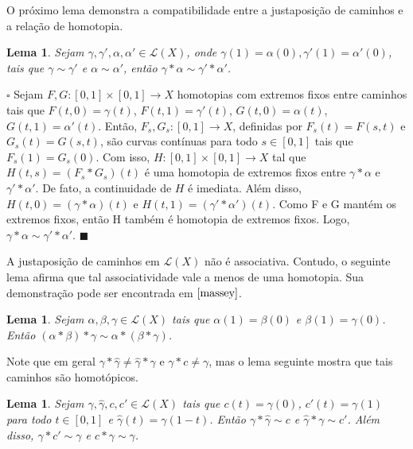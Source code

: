 \documentclass[12pt]{book}
\newtheorem{lema}[teorema]{Lema}
\newenvironment{prova}[1]{$\square$ #1}{\hfill$\blacksquare$}
\newcommand{\caminhos}{\mathcal{L}}
\newcommand{\caminhossempontobase}[1]{\caminhos(#1)}
\newcommand{\intervalo}{[0,1]}
\begin{document}
	O próximo lema demonstra a compatibilidade entre a justaposição de caminhos e a relação de homotopia.
	
	\begin{lema}\label{lema_compatibilidade_produto_caminhos}
		Sejam $\gamma, \gamma', \alpha, \alpha' \in \caminhossempontobase{X}$, onde $\gamma(1) = \alpha(0), \gamma'(1) = \alpha'(0) $, tais que $\gamma \sim \gamma'$ e $\alpha \sim \alpha'$, então $\gamma * \alpha \sim \gamma' * \alpha'$.
	\end{lema}
	\begin{prova}
		Sejam  $F, G:[0,1] \times [0,1] \to X$ homotopias com extremos fixos entre caminhos tais que $F(t,0)=\gamma(t)$, $F(t,1)=\gamma'(t)$, $G(t,0)=\alpha(t)$, $G(t,1)=\alpha'(t)$. Então, $F_{s}, G_{s}:\intervalo \to X$, definidas por $F_{s}(t) = F(s,t)$ e $G_{s}(t) = G(s,t)$, são curvas contínuas para todo $s \in \intervalo$ tais que $F_{s}(1) = G_{s}(0)$. Com isso, $H :\intervalo\times \intervalo\to X$ tal que $H(t, s)=(F_{s}*G_{s})(t)$ é uma homotopia de extremos fixos entre $\gamma*\alpha$ e $\gamma'*\alpha'$. De fato, a continuidade de $H$ é imediata. Além disso, $H(t, 0) = (\gamma*\alpha)(t)$ e $H(t, 1) = (\gamma'*\alpha')(t)$. Como F e G mantém os extremos fixos, então H também é homotopia de extremos fixos. Logo, $\gamma*\alpha \sim \gamma'*\alpha'$.
	\end{prova}
	
	A justaposição de caminhos em $\caminhossempontobase{X}$ não é associativa. Contudo, o seguinte lema afirma que tal associatividade vale a menos de uma homotopia. Sua demonstração pode ser encontrada em $\cite{massey}$.
	
	\begin{lema}\label{lema_associatividade_produto_caminhos}
		Sejam $\alpha, \beta, \gamma\in \caminhossempontobase{X}$ tais que $\alpha(1)=\beta(0)$ e $\beta(1)=\gamma(0)$. Então $(\alpha*\beta)*\gamma \sim \alpha*(\beta*\gamma)$.
	\end{lema}
	
	Note que em geral $\gamma*\hat{\gamma}\neq \hat{\gamma}*\gamma$ e $\gamma*c\neq \gamma$, mas o lema seguinte mostra que tais caminhos são homotópicos.
	
	\begin{lema}\label{lema_caminho_inverso}
		Sejam $\gamma, \hat{\gamma} , c,c' \in \caminhossempontobase{X}$ tais que $c(t) = \gamma(0)$, $c'(t) = \gamma(1)$ para todo $t\in \intervalo$ e $\hat{\gamma} (t) = \gamma(1-t)$. Então $\gamma*\hat{\gamma}  \sim c$ e $\hat{\gamma}  *\gamma\sim c'$. Além disso, $\gamma * c' \sim\gamma$ e $c * \gamma \sim \gamma$.
	\end{lema} 	
	
\end{document}
